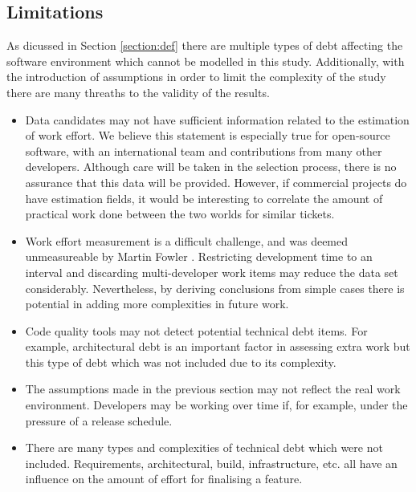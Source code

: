 \documentclass{mprop}
\begin{document}

\subsection{Limitations}

As dicussed in Section \ref{section:def} there are multiple types of debt
affecting the software environment which cannot be modelled in this study.
Additionally, with the introduction of assumptions in order to limit the
complexity of the study there are many threaths to the validity of the results.

\begin{itemize}
	\item Data candidates may not have sufficient information related to the
	      estimation of work effort. We believe this statement is especially true for
	      open-source software, with an international team and contributions from many
	      other developers. Although care will be taken in the selection process,
	      there is no assurance that this data will be provided. However, if
	      commercial projects do have estimation fields, it would be interesting to
	      correlate the amount of practical work done between the two worlds for
	      similar tickets.
	\item Work effort measurement is a difficult challenge, and was deemed
	      unmeasureable by Martin Fowler \cite{CannotMeasureProductivity}. Restricting
	      development time to an interval and discarding multi-developer work items
	      may reduce the data set considerably. Nevertheless, by deriving conclusions
	      from simple cases there is potential in adding more complexities in future work.
	\item Code quality tools may not detect potential technical debt items. For
	      example, architectural debt is an important factor in assessing extra work but
	      this type of debt which was not included due to its complexity.
	\item The assumptions made in the previous section may not reflect the real
	      work environment. Developers may be working over time if, for example, under
	      the pressure of a release schedule.
	\item There are many types and complexities of technical debt which were not
	      included. Requirements, architectural, build, infrastructure, etc. all have
	      an influence on the amount of effort for finalising a feature.
\end{itemize}
\end{document}
